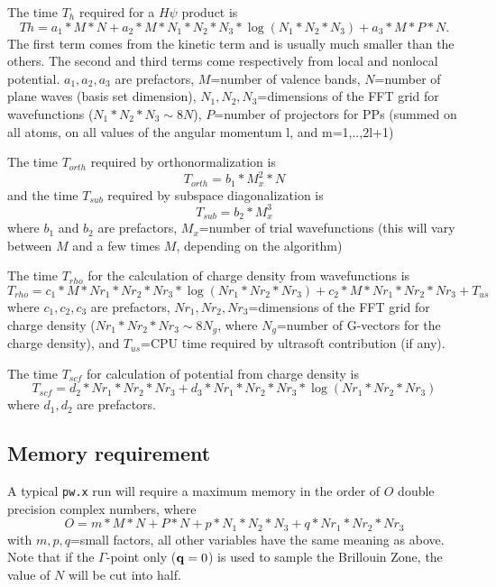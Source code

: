 \documentclass[12pt]{article}
\begin{document}
The time $T_h$ required for a $H\psi$ product is
\begin{equation}
      Th  = a_1*M*N
          + a_2*M*N_1*N_2*N_3*\log(N_1*N_2*N_3)
          + a_3*M*P*N.
\end{equation}
The first term comes from the kinetic term and is usually much smaller than
the others. The second and third terms come respectively from local and 
nonlocal
potential. $ a_1, a_2, a_3$ are prefactors, $M$=number of valence bands,
$N$=number of plane waves (basis set dimension), 
$N_1, N_2, N_3$=dimensions of the FFT grid for wavefunctions
($N_1*N_2*N_3 \sim 8N$), $P$=number of projectors for PPs 
(summed on all atoms, on all values of the angular momentum l, and m=1,..,2l+1)

The time $T_{orth}$ required by orthonormalization is
\begin{equation}
      T_{orth}=b_1*M_x^2*N
\end{equation}
and the time $T_{sub}$ required by subspace diagonalization is
\begin{equation}
   T_{sub}=b_2*M_x^3
\end{equation}
where $b_1$ and $b_2$ are prefactors, $M_x$=number of trial wavefunctions
(this will vary between $M$ and a few times $M$, depending on the algorithm)

The time $T_{rho}$ for the calculation of charge density from wavefunctions is
\begin{equation}
      T_{rho}=c_1*M*Nr_1*Nr_2*Nr_3*\log(Nr_1*Nr_2*Nr_3) + c_2*M*Nr_1*Nr_2*Nr_3
             + T_{us}
\end{equation}
where $c_1, c_2, c_3$ are prefactors,
$Nr_1,Nr_2,Nr_3$=dimensions of the FFT grid for charge density
($Nr_1*Nr_2*Nr_3 \sim 8N_g$, where $N_g$=number of G-vectors
for the charge density), and $T_{us}$=CPU time required by ultrasoft 
contribution (if any).

The time $T_{scf}$ for calculation of potential from charge density is
\begin{equation}
      T_{scf} = d_2*Nr_1*Nr_2*Nr_3 + d_3*Nr_1*Nr_2*Nr_3*\log(Nr_1*Nr_2*Nr_3) 
\end{equation}
where $d_1, d_2$ are prefactors.

\subsection{Memory requirement}

A typical {\tt pw.x} run will require a maximum memory in the order of
$O$ double precision complex numbers, where
\begin{equation}
     O = m*M*N + P*N + p*N_1*N_2*N_3 + q*Nr_1*Nr_2*Nr_3
\end{equation}
with $m,p,q$=small factors, all other variables have the same meaning 
as above. Note that if the $\Gamma$-point only (${\bf q}=0$) is used
to sample the Brillouin Zone, the value of $N$ will be cut into half.
\end{document}
